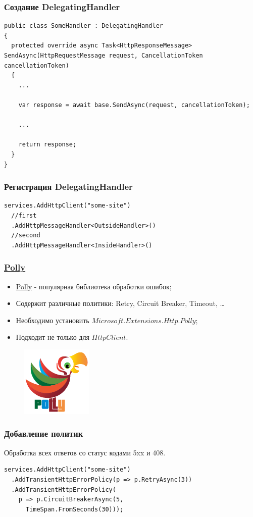 \documentclass{beamer}
\begin{document}
\begin{frame}[fragile]
\frametitle{Создание DelegatingHandler}
\begin{lstlisting}
public class SomeHandler : DelegatingHandler
{
  protected override async Task<HttpResponseMessage> SendAsync(HttpRequestMessage request, CancellationToken cancellationToken)
  {
    ...
        
    var response = await base.SendAsync(request, cancellationToken);

    ...
        
    return response;        
  }
}
\end{lstlisting}
\end{frame}

\begin{frame}[fragile]
\frametitle{Регистрация DelegatingHandler}
\begin{lstlisting}
services.AddHttpClient("some-site")
  //first
  .AddHttpMessageHandler<OutsideHandler>()
  //second
  .AddHttpMessageHandler<InsideHandler>()
\end{lstlisting}
\end{frame}

\begin{frame}
\frametitle{\href{https://github.com/App-vNext/Polly}{Polly}}
\begin{itemize}
\item \href{https://github.com/App-vNext/Polly}{Polly} - популярная библиотека обработки ошибок;
\item Содержит различные политики: Retry, Circuit Breaker, Timeout, \ldots
\item Необходимо установить \href{https://www.nuget.org/packages/Microsoft.Extensions.Http.Polly/}{$Microsoft.Extensions.Http.Polly$};
\item Подходит не только для $HttpClient$.
\end{itemize}
\begin{figure}
\includegraphics[scale=0.4]{polly}
\end{figure}
\end{frame}

\begin{frame}[fragile]
\frametitle{Добавление политик}
Обработка всех ответов со статус кодами 5xx и 408.
\newline
\begin{lstlisting}
services.AddHttpClient("some-site")
  .AddTransientHttpErrorPolicy(p => p.RetryAsync(3))
  .AddTransientHttpErrorPolicy(
    p => p.CircuitBreakerAsync(5, 
      TimeSpan.FromSeconds(30)));
\end{lstlisting}
\end{frame}
\end{document}
